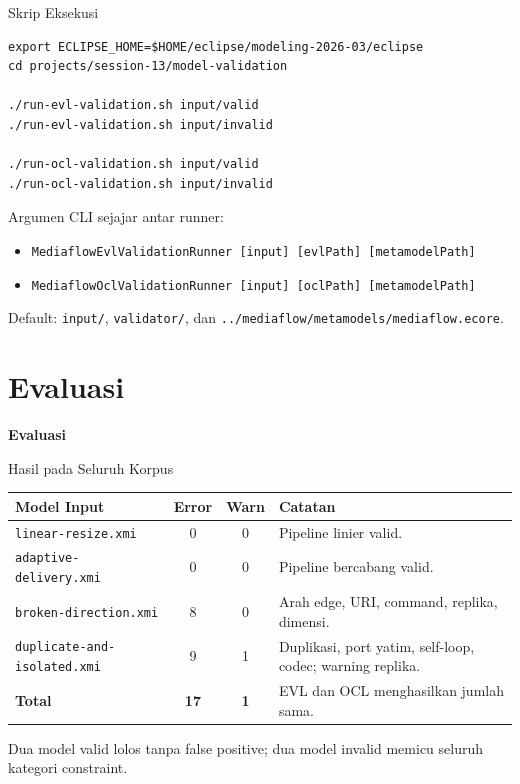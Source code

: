 \documentclass[aspectratio=169, table]{beamer}
\begin{document}
\begin{frame}[fragile]{Skrip Eksekusi}
\vspace{2pt}
\begin{lstlisting}[language=shell, basicstyle=\ttfamily\scriptsize]
export ECLIPSE_HOME=$HOME/eclipse/modeling-2026-03/eclipse
cd projects/session-13/model-validation

./run-evl-validation.sh input/valid
./run-evl-validation.sh input/invalid

./run-ocl-validation.sh input/valid
./run-ocl-validation.sh input/invalid
\end{lstlisting}

\vspace{6pt}
\small
Argumen CLI sejajar antar runner:
\begin{itemize}\scriptsize
  \item \texttt{MediaflowEvlValidationRunner [input] [evlPath] [metamodelPath]}
  \item \texttt{MediaflowOclValidationRunner [input] [oclPath] [metamodelPath]}
\end{itemize}
Default: \texttt{input/}, \texttt{validator/}, dan \texttt{../mediaflow/metamodels/mediaflow.ecore}.
\end{frame}

\section{Evaluasi}
\begin{frame}{\hfill}
	\centering
	\Huge{\textbf{Evaluasi}}
\end{frame}

\begin{frame}{Hasil pada Seluruh Korpus}
\vspace{6pt}
\centering
\scriptsize
\begin{tabular}{|p{}|c|c|p{}|}
\hline
\rowcolor{black!8}
\textbf{Model Input} & \textbf{Error} & \textbf{Warn} & \textbf{Catatan} \\
\hline
\texttt{linear-resize.xmi} & 0 & 0 & Pipeline linier valid. \\
\hline
\texttt{adaptive-delivery.xmi} & 0 & 0 & Pipeline bercabang valid. \\
\hline
\texttt{broken-direction.xmi} & 8 & 0 & Arah edge, URI, command, replika, dimensi. \\
\hline
\texttt{duplicate-and-isolated.xmi} & 9 & 1 & Duplikasi, port yatim, self-loop, codec; warning replika. \\
\hline
\textbf{Total} & \textbf{17} & \textbf{1} & EVL dan OCL menghasilkan jumlah sama. \\
\hline
\end{tabular}

\vspace{8pt}
\small
Dua model valid lolos tanpa false positive; dua model invalid memicu seluruh kategori constraint.
\end{frame}
\end{document}
